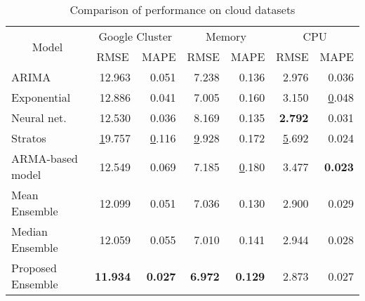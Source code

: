 \begin{table}[]
\centering
\caption{Comparison of performance on cloud datasets}
\label{prediction_cloud}
\begin{tabular}{|l|r|r|r|r|r|r|}
\hline
\multicolumn{1}{|c|}{\multirow{2}{*}{Model}} & \multicolumn{2}{c|}{Google Cluster}                   & \multicolumn{2}{c|}{Memory}                              & \multicolumn{2}{c|}{CPU}                              \\ \cline{2-7} 
\multicolumn{1}{|c|}{}                       & \multicolumn{1}{c|}{RMSE} & \multicolumn{1}{c|}{MAPE} & \multicolumn{1}{c|}{RMSE} & \multicolumn{1}{c|}{MAPE} & \multicolumn{1}{c|}{RMSE} & \multicolumn{1}{c|}{MAPE} \\ \hline
ARIMA                                        & 12.963                    & 0.051                     & 7.238                     & 0.136                     & 2.976                     & 0.036                     \\ \hline
Exponential                                  & 12.886                    & 0.041                     & 7.005                     & 0.160                     & 3.150                     & {\ul 0.048}               \\ \hline
Neural net.                                  & 12.530                    & 0.036                     & 8.169                     & 0.135                     & \textbf{2.792}            & 0.031                     \\ \hline
Stratos                                      & {\ul 19.757}              & {\ul 0.116}               & {\ul 9.928}               & 0.172               & {\ul 5.692}               & 0.024            \\ \hline

ARMA-based model                                      & 12.549              & 0.069               & 7.185               & {\ul 0.180}               & 3.477               & \textbf{0.023}            \\ \hline

Mean Ensemble                                      & 12.099              & 0.051               & 7.036               & 0.130               & 2.900               & 0.029            \\ \hline
Median Ensemble                                      &  12.059              & 0.055               &  7.010               & 0.141               & 2.944               & 0.028            \\ \hline

Proposed Ensemble                                     & \textbf{11.934}           & \textbf{0.027}            & \textbf{6.972}            & \textbf{0.129}            & 2.873                     & 0.027                     \\ \hline
\end{tabular}
\end{table}